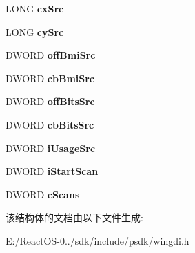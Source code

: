 \begin{DoxyCompactItemize}
L\+O\+NG {\bfseries cx\+Src}
\item 
\mbox{\label{structtag_e_m_r_s_e_t_d_i_b_i_t_s_t_o_d_e_v_i_c_e_ae9a9dcea4493a3aaba6896fd932868c7}} 
L\+O\+NG {\bfseries cy\+Src}
\item 
\mbox{\label{structtag_e_m_r_s_e_t_d_i_b_i_t_s_t_o_d_e_v_i_c_e_a3bf1ee486d7e523f10f1057434aa4925}} 
D\+W\+O\+RD {\bfseries off\+Bmi\+Src}
\item 
\mbox{\label{structtag_e_m_r_s_e_t_d_i_b_i_t_s_t_o_d_e_v_i_c_e_a8012ac3b7c31bf72e6bcf2b552aca4b0}} 
D\+W\+O\+RD {\bfseries cb\+Bmi\+Src}
\item 
\mbox{\label{structtag_e_m_r_s_e_t_d_i_b_i_t_s_t_o_d_e_v_i_c_e_aa55945cf3e1b46171e3e68b3f7cb16ef}} 
D\+W\+O\+RD {\bfseries off\+Bits\+Src}
\item 
\mbox{\label{structtag_e_m_r_s_e_t_d_i_b_i_t_s_t_o_d_e_v_i_c_e_a2f01fda43b93dff2bfee3cc6236d9303}} 
D\+W\+O\+RD {\bfseries cb\+Bits\+Src}
\item 
\mbox{\label{structtag_e_m_r_s_e_t_d_i_b_i_t_s_t_o_d_e_v_i_c_e_a8face46da6a80e115938b66ac80c1869}} 
D\+W\+O\+RD {\bfseries i\+Usage\+Src}
\item 
\mbox{\label{structtag_e_m_r_s_e_t_d_i_b_i_t_s_t_o_d_e_v_i_c_e_a6b5f3a7f7695ccaaa2bccb92ecb2d788}} 
D\+W\+O\+RD {\bfseries i\+Start\+Scan}
\item 
\mbox{\label{structtag_e_m_r_s_e_t_d_i_b_i_t_s_t_o_d_e_v_i_c_e_a10e32d1b7c26c1c44ababd23144f656e}} 
D\+W\+O\+RD {\bfseries c\+Scans}
\end{DoxyCompactItemize}


该结构体的文档由以下文件生成\+:\begin{DoxyCompactItemize}
\item 
E\+:/\+React\+O\+S-\/0../sdk/include/psdk/wingdi.\+h\end{DoxyCompactItemize}
